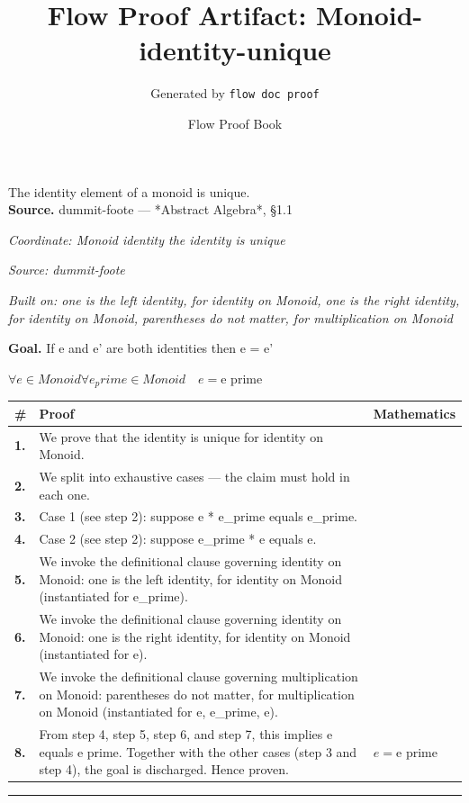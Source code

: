 \documentclass[11pt]{article}
\title{Flow Proof Artifact: Monoid-identity-unique}
\author{Generated by \texttt{flow doc proof}}
\date{Flow Proof Book}
\theoremstyle{definition}
\begin{document}
\maketitle
The identity element of a monoid is unique.\\[0.5em]
\textbf{Source.} dummit-foote — *Abstract Algebra*, §1.1\\[0.5em]
\bigskip
{}\par
\smallskip\noindent\textit{Coordinate: Monoid \cdot identity \cdot the identity is unique}\par
\smallskip\noindent\textit{Source: dummit-foote}\par
\smallskip\noindent\textit{Built on: one is the left identity, for identity on Monoid, one is the right identity, for identity on Monoid, parentheses do not matter, for multiplication on Monoid}\par
\medskip
\noindent\textbf{Goal.} If e and e' are both identities then e = e'\par
\noindent$\displaystyle \forall e \in Monoid \forall e_prime \in Monoid\quad e = \text{e prime}$\par
\medskip
\noindent
\begin{tabular}{@{} >{\raggedright\arraybackslash}p{} >{\raggedright\arraybackslash}p{} >{\raggedleft\arraybackslash}p{} @{}}
\textbf{\#} & \textbf{Proof} & \textbf{Mathematics} \\
\midrule
\textbf{1.} & We prove that the identity is unique for identity on Monoid. & \\[0.45em]
\textbf{2.} & We split into exhaustive cases — the claim must hold in each one. & \\[0.45em]
\textbf{3.} & Case 1 (see step 2): suppose e * e\_prime  equals  e\_prime. & \\[0.45em]
\textbf{4.} & Case 2 (see step 2): suppose e\_prime * e  equals  e. & \\[0.45em]
\textbf{5.} & We invoke the definitional clause governing identity on Monoid: one is the left identity, for identity on Monoid (instantiated for e\_prime). & \\[0.45em]
\textbf{6.} & We invoke the definitional clause governing identity on Monoid: one is the right identity, for identity on Monoid (instantiated for e). & \\[0.45em]
\textbf{7.} & We invoke the definitional clause governing multiplication on Monoid: parentheses do not matter, for multiplication on Monoid (instantiated for e, e\_prime, e). & \\[0.45em]
\textbf{8.} & From step 4, step 5, step 6, and step 7, this implies e equals e prime. Together with the other cases (step 3 and step 4), the goal is discharged. Hence proven. & $\displaystyle e = \text{e prime}$ \\[0.45em]
\bottomrule
\end{tabular}
\label{thm:Monoid-identity-the_identity_is_unique}
\par\medskip\hrule
\end{document}
